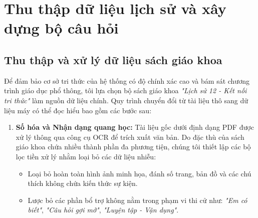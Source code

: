 \section{Thu thập dữ liệu lịch sử và xây dựng bộ câu hỏi}
\label{sec:data_collection}
\subsection{Thu thập và xử lý dữ liệu sách giáo khoa}
Để đảm bảo cơ sở tri thức của hệ thống có độ chính xác cao và bám sát chương trình giáo dục phổ thông, tôi lựa chọn bộ sách giáo khoa \textit{"Lịch sử 12 - Kết nối tri thức"} làm nguồn dữ liệu chính. Quy trình chuyển đổi từ tài liệu thô sang dữ liệu máy có thể đọc hiểu bao gồm các bước sau:
\begin{enumerate}
    \item \textbf{Số hóa và Nhận dạng quang học:}
    Tài liệu gốc dưới định dạng PDF được xử lý thông qua công cụ OCR để trích xuất văn bản. Do đặc thù của sách giáo khoa chứa nhiều thành phần đa phương tiện, chúng tôi thiết lập các bộ lọc tiền xử lý nhằm loại bỏ các dữ liệu nhiễu:
    \begin{itemize}
        \item Loại bỏ hoàn toàn hình ảnh minh họa, đánh số trang, bản đồ và các chú thích không chứa kiến thức sự kiện.
        \item Lược bỏ các phần bổ trợ không nằm trong phạm vi thi cử như: \textit{"Em có biết"}, \textit{"Câu hỏi gợi mở"}, \textit{"Luyện tập - Vận dụng"}.
    \end{itemize}
    

\end{enumerate}
